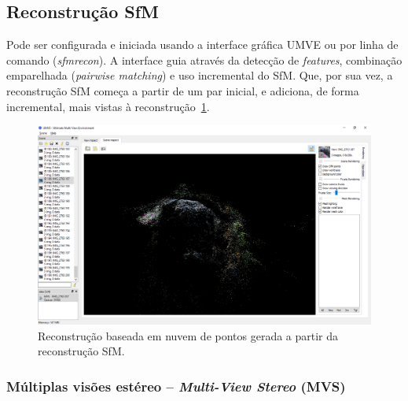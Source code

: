 \subsection*{Reconstrução SfM}

Pode ser configurada e iniciada usando a interface gráfica UMVE ou por linha de comando (\emph{sfmrecon}). A interface guia através da detecção de \emph{features}, combinação emparelhada (\emph{pairwise matching}) e uso incremental do SfM. Que, por sua vez, a reconstrução SfM começa a partir de um par inicial, e adiciona, de forma incremental, mais vistas à reconstrução~\ref{fig:mvesfm}.

\begin{figure}[!h]
	\centering
	\includegraphics[width=0.7\linewidth]{figs/umve5sfm.png}
	\caption{%
	Reconstrução baseada em nuvem de pontos gerada a partir da reconstrução SfM.%
	}\label{fig:mvesfm}
\end{figure}


%
\subsubsection*{Múltiplas visões estéreo -- \emph{Multi-View Stereo} (MVS)}


